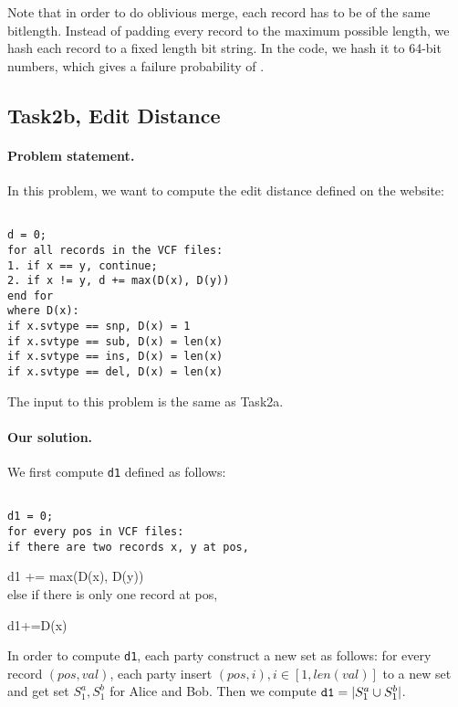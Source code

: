 Note that in order to do oblivious merge, each record has to be of the same bitlength. Instead of padding every record to the maximum possible length, we hash each
record to a fixed length bit string. In the code, we hash it to 64-bit numbers, which gives a failure probability of $ $.

\subsection{Task2b, Edit Distance}
\paragraph{Problem statement.}
In this problem, we want to compute the edit distance defined on the website:
\begin{framed}
{\tt~\\
d = 0;\\
for all records in the VCF files:\\
1. if x == y, continue;\\
2. if x != y, d += max(D(x), D(y))\\
end for\\
where D(x):\\
if x.svtype == snp, D(x) = 1\\
if x.svtype == sub, D(x) = len(x)\\
if x.svtype == ins, D(x) = len(x)\\
if x.svtype == del, D(x) = len(x)\\
}\end{framed}

The input to this problem is the same as Task2a.
\paragraph{Our solution.}
We first compute {\tt d1} defined as follows:
\begin{framed}
{\tt~\\
d1 = 0;\\
for every pos in VCF files:\\
if there are two records x, y at pos,

d1 += max(D(x), D(y))\\
else if there is only one record at pos,

d1+=D(x)\\}
\end{framed}

In order to compute {\tt d1}, each party construct a new set as follows:  for every record $(pos, val)$,
each party insert $(pos, i), i\in[1, len(val)]$ to a new set and get set $S_1^a, S_1^b$ for Alice and Bob. Then we compute
${\tt d1} = |S_1^a\cup S_1^b|$.

